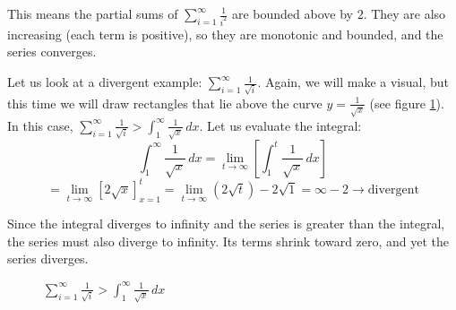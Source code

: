 This means the partial sums of $\sum_{i = 1}^\infty \frac{1}{i^2}$ are bounded above by $2$.
They are also increasing (each term is positive), so they are monotonic and
bounded, and the series converges. 

Let us look at a divergent example: $\sum_{i = 1}^\infty \frac{1}{\sqrt{i}}$.
Again, we will make a visual, but this time we will draw rectangles that lie 
above the curve $y = \frac{1}{\sqrt{x}}$ (see figure \ref{fig:invroot}). In 
this case, $\sum_{i = 1}^\infty \frac{1}{\sqrt{i}}> \int_1^\infty
\frac{1}{\sqrt{x}}\,dx$. Let us evaluate the integral:
$$\int_1^\infty \frac{1}{\sqrt{x}}\,dx = \lim_{t \to \infty} \left[ \int_1^t 
\frac{1}{\sqrt{x}}\,dx \right] $$
$$= \lim_{t \to \infty} \left[ 2 \sqrt{x} \right]_{x=1}^t= \lim_{t \to \infty} 
\left( 2\sqrt{t} \right) - 2\sqrt{1} = \infty - 2 \rightarrow \text{divergent}$$

Since the integral diverges to infinity and the series is greater than the 
integral, the series must also diverge to infinity. Its terms shrink toward zero, and yet the
series diverges.

\begin{figure}[H]
    \centering
    \caption{$\sum_{i = 1}^\infty \frac{1}{\sqrt{i}}> \int_1^\infty 
    \frac{1}{\sqrt{x}}\,dx$}
    \label{fig:invroot}
\end{figure}

